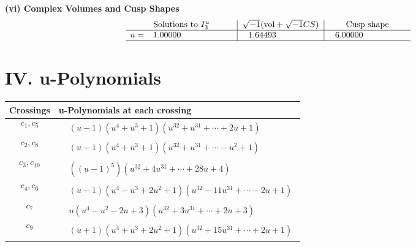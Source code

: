 \documentclass[1p]{elsarticle_modified}
\theoremstyle{definition}
\newcommand{\I}{\sqrt{-1}}
\begin{document}
\newpage\flushleft \textbf{(vi) Complex Volumes and Cusp Shapes}
$$\begin{array}{c|c|c}  
\text{Solutions to }I^u_{3}& \I (\text{vol} + \sqrt{-1}CS) & \text{Cusp shape}\\
 \hline 
\begin{aligned}
u &= \phantom{-}1.00000\phantom{ +0.000000I}\end{aligned}
 & \phantom{-}1.64493\phantom{ +0.000000I} & \phantom{-}6.00000\phantom{ +0.000000I}\\
 \hline 
 \end{array}$$\newpage
\newpage\renewcommand{\arraystretch}{1}
\centering \section*{ IV. u-Polynomials}
\begin{tabular}{m{50pt}|m{274pt}}
Crossings & \hspace{64pt}u-Polynomials at each crossing \\
\hline $$\begin{aligned}c_{1},c_{5}\end{aligned}$$&$\begin{aligned}
&(u-1)(u^4+u^3+1)(u^{32}+u^{31}+\cdots+2 u+1)
\end{aligned}$\\
\hline $$\begin{aligned}c_{2},c_{8}\end{aligned}$$&$\begin{aligned}
&(u-1)(u^4+u^3+1)(u^{32}+u^{31}+\cdots- u^2+1)
\end{aligned}$\\
\hline $$\begin{aligned}c_{3},c_{10}\end{aligned}$$&$\begin{aligned}
&((u-1)^5)(u^{32}+4 u^{31}+\cdots+28 u+4)
\end{aligned}$\\
\hline $$\begin{aligned}c_{4},c_{6}\end{aligned}$$&$\begin{aligned}
&(u-1)(u^4- u^3+2 u^2+1)(u^{32}-11 u^{31}+\cdots-2 u+1)
\end{aligned}$\\
\hline $$\begin{aligned}c_{7}\end{aligned}$$&$\begin{aligned}
&u(u^4- u^2-2 u+3)(u^{32}+3 u^{31}+\cdots+2 u+3)
\end{aligned}$\\
\hline $$\begin{aligned}c_{9}\end{aligned}$$&$\begin{aligned}
&(u+1)(u^4+u^3+2 u^2+1)(u^{32}+15 u^{31}+\cdots+2 u+1)
\end{aligned}$\\
\hline
\end{tabular}\newpage\renewcommand{\arraystretch}{1}
\end{document}
